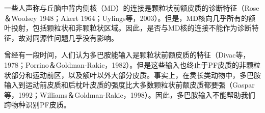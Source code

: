 一些人声称与丘脑中背内侧核（MD）的连接是颗粒状前额皮质的诊断特征（Rose＆Woolsey 1948；Akert 1964；Uylings等，2003）。但是，MD核向几乎所有的额叶投射，包括颗粒状和非颗粒状区域。因此，是否与MD核的连接不能作为诊断特征，故对同源性问题几乎没有影响。

曾经有一段时间，人们认为多巴胺能输入是颗粒状前额皮质的特征（Divac等，1978；Porrino＆Goldman-Rakic，1982）。但是这些输入也终止于PF皮质的非颗粒状部分和运动前区，以及额叶以外大部分皮质。事实上，在灵长类动物中，多巴胺输入到运动前皮质和后枕叶皮质的强度比大多数颗粒状前额皮质都要强（Gaspar等，1992；Williams＆Goldman-Rakic，1998）。因此，多巴胺输入不能帮助我们跨物种识别PF皮质。

